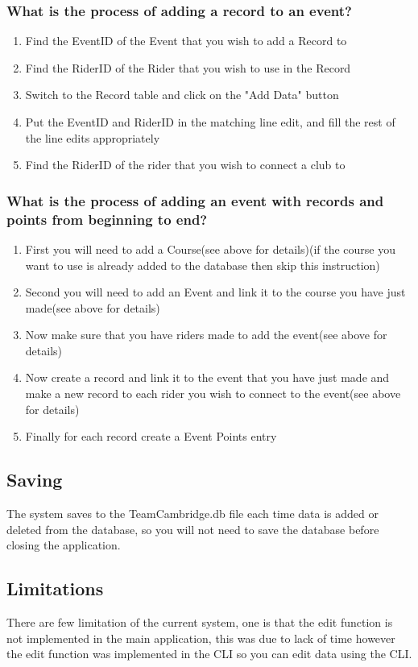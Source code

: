 \subsubsection{What is the process of adding a record to an event?}
\begin{enumerate}
\item Find the EventID of the Event that you wish to add a Record to
\item Find the RiderID of the Rider that you wish to use in the Record
\item Switch to the Record table and click on the "Add Data" button
\item Put the EventID and RiderID in the matching line edit, and fill the rest of the line edits appropriately
\item Find the RiderID of the rider that you wish to connect a club to
\end{enumerate}
\subsubsection{What is the process of adding an event with records and points from beginning to end?}
\begin{enumerate}
\item First you will need to add a Course(see above for details)(if the course you want to use is already added to the database then skip this instruction)
\item Second you will need to add an Event and link it to the course you have just made(see above for details)
\item Now make sure that you have riders made to add the event(see above for details)
\item Now create a record and link it to the event that you have just made and make a new record to each rider you wish to connect to the  event(see above for details)
\item Finally for each record create a Event Points entry
\end{enumerate}

\subsection{Saving}
The system saves to the TeamCambridge.db file each time data is added or deleted from the database, so you will not need to save the database before closing the application.
\subsection{Limitations}
There are few limitation of the current system, one is that the edit function is not implemented in the main application, this was due to lack of time however the edit function was implemented in the CLI so you can edit data using the CLI.
